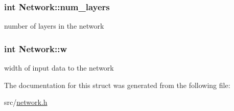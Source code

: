 \subsubsection[{num\+\_\+layers}]{\setlength{\rightskip}{0pt plus 5cm}int Network\+::num\+\_\+layers}\hypertarget{structNetwork_aa451a7979d7e781e7bccc4d4c0fcf133}{}\label{structNetwork_aa451a7979d7e781e7bccc4d4c0fcf133}
number of layers in the network 
\subsubsection[{w}]{\setlength{\rightskip}{0pt plus 5cm}int Network\+::w}\hypertarget{structNetwork_aa717aa8318a8498353e198eba3d191ea}{}\label{structNetwork_aa717aa8318a8498353e198eba3d191ea}
width of input data to the network 

The documentation for this struct was generated from the following file\+:\begin{DoxyCompactItemize}
\item 
src/\hyperlink{network_8h}{network.\+h}\end{DoxyCompactItemize}
